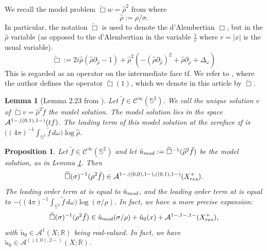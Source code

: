 \documentclass[10pt,a4paper,reqno]{amsart}
\newcommand{\CI}{\mathcal{C}^\infty}
\newcommand{\RR}{\mathbb{R}}
\newcommand{\A}{\mathcal{A}}
\newcommand{\pa}{\partial}
\newcommand{\ti}{\tilde}
\newcommand{\inv}{^{-1}}
\renewcommand{\S}{{\mathbb S}}
\let\hat\widehat
\newtheorem{lemma}[theorem]{Lemma}
\newtheorem{proposition}[theorem]{Proposition}
\theoremstyle{definition}
\theoremstyle{remark}
\numberwithin{equation}{section}
\newcommand{\xs}{\sigma}
\newcommand{\R}{\mathbb R}
\newcommand{\calA}{\mathcal A}
\newcommand{\cA}{\mathcal A}
\newcommand{\wh}{\widehat}
\begin{document}
We recall the model problem $\widetilde \Box w = \hat \rho^2$ from \cite[Lemma 2.23]{Hin22} where $$\hat \rho := \rho / \sigma.$$ In particular, the notation $\widetilde{\Box}$ is used to denote the d'Alembertian $\Box$, but in the $\hat \rho$ variable (as opposed to the d'Alembertian in the variable $\frac{1}{r}$ where $r = |x|$ is the usual variable).
\begin{equation}
\label{Tilde Box}
	\widetilde{\Box} := 2i\hat{\rho}(\hat{\rho}\pa_{\hat{\rho}}-1) + \hat{\rho}^2 (- (\hat{\rho}\pa_{\hat{\rho}})^2 + \hat{\rho}\pa_{\hat{\rho}} + \Delta_\omega)
\end{equation}
This is regarded as an operator on the intermediate face tf. We refer to \cite[Definition 2.20]{Hin22}, where the author  defines the operator $\widetilde{\Box}(1)$, which we denote in this article by $\widetilde{\Box}$.


\begin{lemma}[Lemma 2.23 from \cite{Hin22}]
\label{lem:2.23Hintz}
Let $\ti f \in \CI(\mathbb{S}^2)$. We call the unique solution $v$ of $\widetilde\Box v = \hat \rho^2 \tilde f$ the model solution. The model solution lies in the space $\A^{1-,((0,1),1-)}(\rm{tf})$. The leading term of this model solution at the zeroface {\emph{zf}} is $\big((4\pi)^{-1}\int_{\S^2} \tilde{f}\,d\omega\big)\log \hat \rho$.
\end{lemma}

\begin{proposition}
\label{Hintz Lemma 2.24}
Let $\ti f \in \CI(\S^2)$ and let $\ti u_{\rm mod} := \widetilde{\Box}\inv (\hat \rho^2 \ti f)$ be the model solution, as in Lemma \ref{lem:2.23Hintz}. Then
$$\wh\Box(\xs)\inv (\rho^2 \ti f) \in \cA^{1-, ((0,0), 1-), ( (0,1), 1-)}(X_{\rm res}^+).$$
The leading order term at  is equal to $\ti u_{\rm mod}$, and the leading order term at  is equal to $- \big((4\pi)^{-1}\int_{\S^2} \tilde{f}\,d\omega\big)\log(\sigma/\rho)$. In fact, we have a more precise expansion:
\begin{equation}
\label{eq:better}
\wh\Box(\xs)\inv (\rho^2 \ti f) \in \tilde u_{\rm mod}(\sigma/\rho) + \tilde{u}_0(x) + \calA^{1-,1-,1-}(X_{\rm res}^+),
\end{equation}
with $\tilde{u}_0 \in \A^1(X;\R)$ being real-valued. In fact, we have $\tilde{u}_0\in\A^{((1,0),2-)}(X;\RR)$.
\end{proposition}
\end{document}
